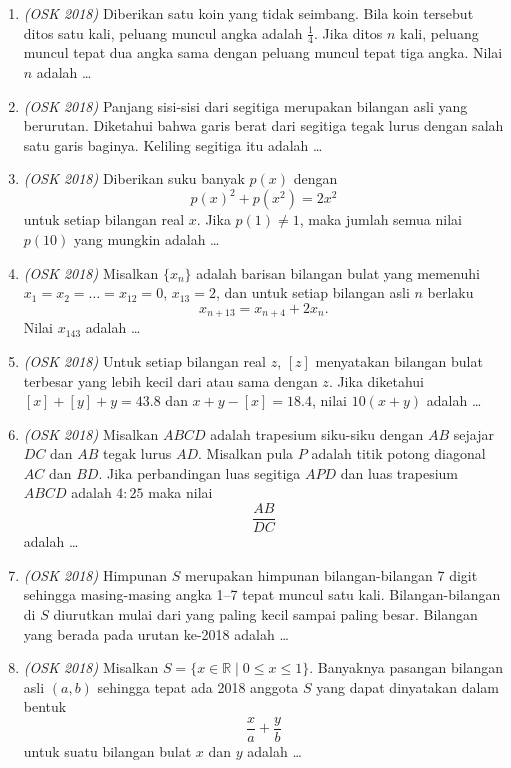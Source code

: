 \documentclass[11pt]{scrartcl}
\begin{document}
\begin{enumerate}
    \item \textit{(OSK 2018)}  Diberikan satu koin yang tidak seimbang. Bila koin tersebut ditos satu kali, peluang muncul angka adalah $\frac{1}{4}$. Jika ditos $n$ kali, peluang muncul tepat dua angka sama dengan peluang muncul tepat tiga angka. Nilai $n$ adalah \dots

    \item \textit{(OSK 2018)}  Panjang sisi-sisi dari segitiga merupakan bilangan asli yang berurutan. Diketahui bahwa garis berat dari segitiga tegak lurus dengan salah satu garis baginya. Keliling segitiga itu adalah \dots

    \item \textit{(OSK 2018)}  Diberikan suku banyak $p(x)$ dengan
    \[
    p(x)^2 + p(x^2) = 2x^2
    \]
    untuk setiap bilangan real $x$. Jika $p(1) \ne 1$, maka jumlah semua nilai $p(10)$ yang mungkin adalah \dots

\item \textit{(OSK 2018)} Misalkan $\{x_n\}$ adalah barisan bilangan bulat yang memenuhi  
$x_1 = x_2 = \dots = x_{12} = 0$, $x_{13} = 2$, dan untuk setiap bilangan asli $n$ berlaku
\[
x_{n+13} = x_{n+4} + 2x_n.
\]
Nilai $x_{143}$ adalah \dots

\item \textit{(OSK 2018)} Untuk setiap bilangan real $z$, $[z]$ menyatakan bilangan bulat terbesar yang lebih kecil dari atau sama dengan $z$.  
Jika diketahui $[x] + [y] + y = 43.8$ dan $x + y - [x] = 18.4$, nilai $10(x + y)$ adalah \dots

\item \textit{(OSK 2018)} Misalkan $ABCD$ adalah trapesium siku-siku dengan $AB$ sejajar $DC$ dan $AB$ tegak lurus $AD$.  
Misalkan pula $P$ adalah titik potong diagonal $AC$ dan $BD$.  
Jika perbandingan luas segitiga $APD$ dan luas trapesium $ABCD$ adalah $4 : 25$ maka nilai
\[
\frac{AB}{DC}
\]
adalah \dots

\item \textit{(OSK 2018)} Himpunan $S$ merupakan himpunan bilangan-bilangan 7 digit sehingga masing-masing angka 1--7 tepat muncul satu kali.  
Bilangan-bilangan di $S$ diurutkan mulai dari yang paling kecil sampai paling besar.  
Bilangan yang berada pada urutan ke-2018 adalah \dots

\item \textit{(OSK 2018)} Misalkan $S = \{x \in \mathbb{R} \mid 0 \le x \le 1\}$.  
Banyaknya pasangan bilangan asli $(a,b)$ sehingga tepat ada 2018 anggota $S$ yang dapat dinyatakan dalam bentuk
\[
\frac{x}{a} + \frac{y}{b}
\]
untuk suatu bilangan bulat $x$ dan $y$ adalah \dots


\end{enumerate}
\end{document}
